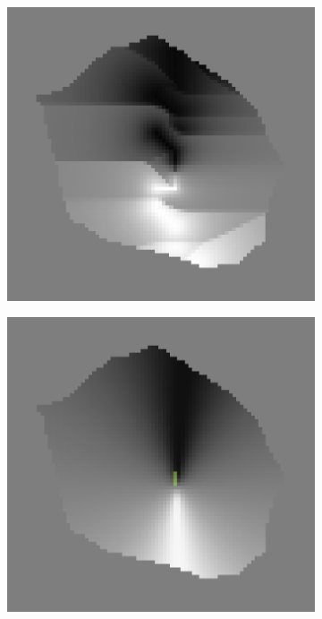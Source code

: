 \begin{figure}[htpb]
\begin{subfigure}[b]{\mywidth}
		\caption{\label{fig:dtx_spline}}
	\end{subfigure}\\
	\hspace{\mywidth}
	\hspace{3mm}
	\begin{subfigure}[b]{\mywidth}
		\centering
		\includegraphics[width=\textwidth]{data/images/interpolation/gradz_linear.png}
		\caption{\label{fig:grad_linear}}
	\end{subfigure}
	\hspace{3mm}
	\begin{subfigure}[b]{\mywidth}
		\centering
		\includegraphics[width=\textwidth]{data/images/interpolation/gradz_spline.png}

\end{subfigure}
\end{figure}
